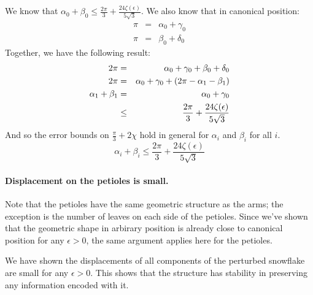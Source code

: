 We know that $\alpha_0 + \beta_0 \leq \frac{2\pi}{3} + \frac{24 \zeta(\epsilon)}{5\sqrt{3}}.$
We also know that in canonical position:
$$ 
\begin{array}{rcl}
\pi &=& \alpha_0 + \gamma_0 \\
\pi &=& \beta_0 + \delta_0
\end{array}
$$
Together, we have the following result:
\begin{eqnarray*}
2\pi &=& \alpha_0 + \gamma_0 + \beta_0 + \delta_0\\
2\pi &=& \alpha_0 + \gamma_0 + \left( 2\pi - \alpha_1 - \beta_1 \right)\\
\alpha_1 + \beta_1&=&\alpha_0 + \gamma_0 \\
&\leq& \frac{2\pi}{3} + \frac{24\zeta(\epsilon)}{5\sqrt{3}}\\
\end{eqnarray*}
And so the error bounds on $\frac{\pi}{3}+2\chi$ hold in general for $\alpha_i$ and $\beta_i$ for all $i$.  
$$\alpha_i + \beta_i \leq \frac{2\pi}{3} + \frac{24\zeta(\epsilon)}{5\sqrt{3}}$$
\paragraph{Displacement on the petioles is small.}
Note that the petioles have the same geometric structure as the arms; the exception is the number of leaves on each side of the petioles. 
Since we've shown that the geometric shape in arbirary position is already close to canonical position for any $\epsilon>0$, the same argument applies here for the petioles.

We have shown the displacements of all components of the perturbed snowflake are small for any $\epsilon > 0$.  
This shows that the structure has stability in preserving any information encoded with it.










